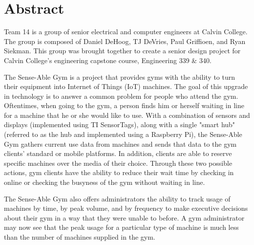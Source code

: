\documentclass[PPFS.tex]{template/subfiles}
\begin{document}
\section*{Abstract}

Team 14 is a group of senior electrical and computer engineers at Calvin College. The group is composed of Daniel DeHoog, TJ DeVries, Paul Griffioen, and Ryan Siekman. This group was brought together to create a senior design project for Calvin College's engineering capstone course, Engineering 339 \& 340.

The Sense-Able Gym is a project that provides gyms with the ability to turn their equipment into Internet of Things (IoT) machines. The goal of this upgrade in technology is to answer a common problem for people who attend the gym. Oftentimes, when going to the gym, a person finds him or herself waiting in line for a machine that he or she would like to use.  With a combination of sensors and displays (implemented using TI SensorTags), along with a single
"smart hub" (referred to as the hub and implemented using a Raspberry Pi), the Sense-Able Gym gathers current use data from machines and sends that data to the gym clients' standard or mobile platforms. In addition, clients are able to reserve specific machines over the media of their choice. Through these two possible actions, gym clients have the ability to reduce their wait time by checking in online or checking the busyness of the gym without waiting in line.

The Sense-Able Gym also offers administrators the ability to track usage of machines by time, by peak volume, and by frequency to make executive decisions about their gym in a way that they were unable to before. A gym administrator may now see that the peak usage for a particular type of machine is much less than the number of machines supplied in the gym.
\end{document}
